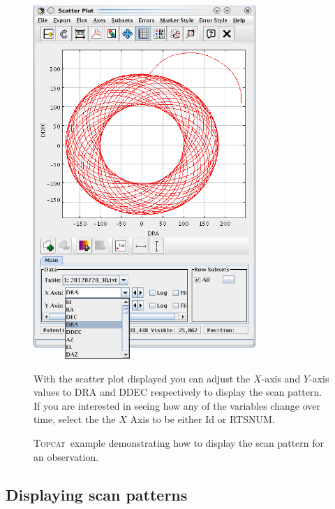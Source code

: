 \documentclass[twoside,11pt]{article}
\newcommand{\htmladdnormallink}[2]{#1}
\newenvironment{latexonly}{}{}
\newcommand{\xlabel}[1]{}
\renewcommand{\_}{\texttt{\symbol{95}}}
\newenvironment{fmpage}[1]{\begin{lrbox}{\fmbox}\begin{minipage}{#1}}{\end{minipage}\end{lrbox}\fbox{\usebox{\fmbox}}}
\newcommand{\topcat}{\htmladdnormallink{\textsc{Topcat}}{http://www.starlink.ac.uk/topcat}}
\begin{document}
\begin{latexonly}
\begin{figure}[ht!]
\begin{center}
\begin{fmpage}{0.95\linewidth}
\begin{minipage}[c]{0.6\linewidth}
\centering
\includegraphics[width=0.75\textwidth]{sc21_topcat2}
\vspace{0.2cm}
\end{minipage}
\hspace{0.3cm}
\begin{minipage}[c]{0.32\linewidth}
With the scatter plot displayed you can adjust the $X$-axis and
$Y$-axis values to DRA and DDEC respectively to display the scan pattern.
If you are interested in seeing how any of the variables change over time,
select the the $X$ Axis to be either Id or RTS\_NUM.
\end{minipage}

\end{fmpage}
\end{center}
\caption[Displaying the scan pattern with \topcat]{
  \small \topcat\ example demonstrating how to display
  the scan pattern for an observation.
}
\label{fig:topcat}
\end{figure}
\end{latexonly}


\subsection{\xlabel{scan_pat}Displaying scan patterns}
\label{sec:scan}
\end{document}
